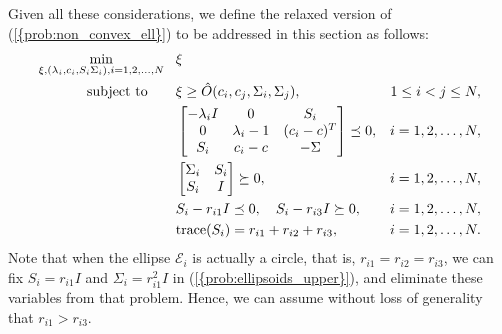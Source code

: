 \documentclass{siamltex}
\begin{document}
Given all these considerations, we define the relaxed version of
{(\ref{{prob:non_convex_ell}})} to be addressed in this section as
follows:
\begin{subequations}
\label{prob:non_convex_ell_relax}
\begin{align}
\min_{\xi, (\lambda_i,c_i,S_i \Sigma_i), i=1,2,\dotsc,N} \;\;\;&
\xi\\
\mbox{subject to} \qquad &\xi\geq \hat{O}(c_i, c_j, \Sigma_i, \Sigma_j),& 1\leq i<j\leq N,\label{prob:non_convex_ell_relax1}\\ 
\label{prob:non_convex_ell_relax2} 
&\left[ \begin{matrix} - \lambda_i I &0&S_i\\
0& \lambda_i-1&(c_i-c)^T\\ 
S_i &c_i-c&-\Sigma \end{matrix} \right] \preceq 0, & i=1,2,\dotsc,N, \\
\label{prob:non_convex_ell_relax2a}
&\left[ \begin{matrix} \Sigma_i & S_i \\ S_i & I \end{matrix} \right] \succeq 0, & i=1,2,\dotsc,N, \\
\label{prob:non_convex_ell_relax3}
&S_i-r_{i1} I\preceq 0, \quad S_i-r_{i3} I\succeq 0,  & i=1,2,\dots,N, \\
\label{prob:non_convex_ell_relax4}
& {\mbox{\rm trace}}(S_i)=r_{i1}+r_{i2}+r_{i3}, & i=1,2,\dots,N.
\end{align}
\end{subequations}
Note that when the ellipse $\mathcal{E}_i$ is actually a circle, that
is, $r_{i1}=r_{i2}=r_{i3}$, we can fix $S_i = r_{i1} I$ and $\Sigma_i
= r_{i1}^2 I$ in {(\ref{{prob:ellipsoids_upper}})}, and eliminate these
variables from that problem. Hence, we can assume without loss of
generality that $r_{i1}>r_{i3}$.
\end{document}
